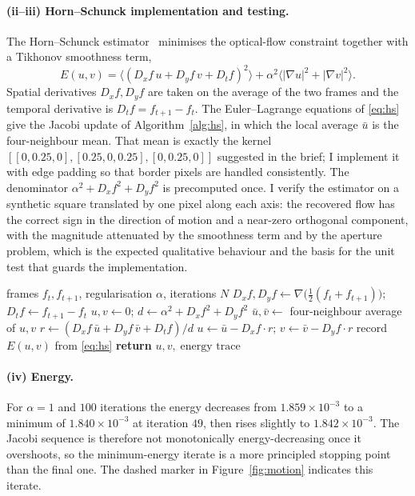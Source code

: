 \documentclass[11pt,a4paper]{article}
\begin{document}
\paragraph{(ii--iii) Horn--Schunck implementation and testing.}
The Horn--Schunck estimator~\cite{hornschunck} minimises the optical-flow
constraint together with a Tikhonov smoothness term,
\begin{equation}
  E(u,v)=\big\langle (D_xf\,u + D_yf\,v + D_tf)^2\big\rangle
        + \alpha^2\big\langle |\nabla u|^2+|\nabla v|^2\big\rangle .
  \label{eq:hs}
\end{equation}
Spatial derivatives \(D_xf,D_yf\) are taken on the average of the two frames and
the temporal derivative is \(D_tf=f_{t+1}-f_t\). The Euler--Lagrange equations of
\eqref{eq:hs} give the Jacobi update of Algorithm~\ref{alg:hs}, in which the
local average \(\bar u\) is the four-neighbour mean. That mean is exactly the
kernel \([[0,0.25,0],[0.25,0,0.25],[0,0.25,0]]\) suggested in the brief; I
implement it with edge padding so that border pixels are handled consistently.
The denominator \(\alpha^2+D_xf^2+D_yf^2\) is precomputed once. I verify the
estimator on a synthetic square translated by one pixel along each axis: the
recovered flow has the correct sign in the direction of motion and a
near-zero orthogonal component, with the magnitude attenuated by the smoothness
term and by the aperture problem, which is the expected qualitative behaviour
and the basis for the unit test that guards the implementation.

\begin{algorithm}[H]
\caption{Horn--Schunck optical flow (Jacobi iteration)}
\label{alg:hs}
\begin{algorithmic}[1]
\REQUIRE frames \(f_t,f_{t+1}\), regularisation \(\alpha\), iterations \(N\)
\STATE \(D_xf,D_yf \leftarrow \nabla\big(\tfrac12(f_t+f_{t+1})\big)\); \quad \(D_tf \leftarrow f_{t+1}-f_t\)
\STATE \(u,v \leftarrow 0\); \quad \(d \leftarrow \alpha^2 + D_xf^2 + D_yf^2\)
  \STATE \(\bar u,\bar v \leftarrow\) four-neighbour average of \(u,v\)
  \STATE \(r \leftarrow (D_xf\,\bar u + D_yf\,\bar v + D_tf)/d\)
  \STATE \(u \leftarrow \bar u - D_xf\cdot r\); \quad \(v \leftarrow \bar v - D_yf\cdot r\)
  \STATE record \(E(u,v)\) from \eqref{eq:hs}
\ENDFOR
\STATE \textbf{return} \(u,v,\;\text{energy trace}\)
\end{algorithmic}
\end{algorithm}

\paragraph{(iv) Energy.}
For \(\alpha=1\) and \(100\) iterations the energy decreases from
\(1.859\times10^{-3}\) to a minimum of \(1.840\times10^{-3}\) at iteration
\(49\), then rises slightly to \(1.842\times10^{-3}\). The Jacobi sequence is
therefore not monotonically energy-decreasing once it overshoots, so the
minimum-energy iterate is a more principled stopping point than the final one.
The dashed marker in Figure~\ref{fig:motion} indicates this iterate.
\end{document}
